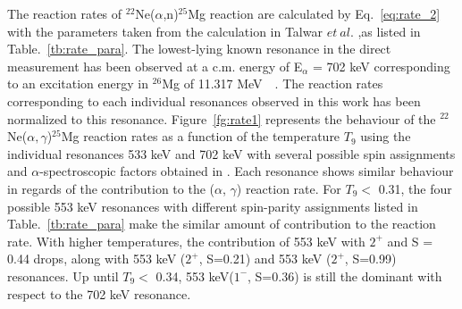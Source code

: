 The reaction rates of $^{22}$Ne($\alpha$,n)$^{25}$Mg reaction are calculated by Eq.~\ref{eq:rate_2} with the parameters taken from the calculation in Talwar $et\ al.$\citep{Rashi2016} ,as listed in Table.~\ref{tb:rate_para}. The lowest-lying known resonance in the direct measurement has been observed at a c.m. energy of E$_\alpha$ = 702 keV corresponding to an excitation energy in $^{26}$Mg of 11.317 MeV~\citep{Wolke1989}~\citep{Jaeger2001}. The reaction rates corresponding to each individual resonances observed in this work has been normalized to this resonance.   Figure~\ref{fg:rate1} represents the behaviour of the $^{22}$Ne($\alpha,\gamma$)$^{25}$Mg reaction rates as a function of the temperature $T_9$ using the individual resonances 533 keV and 702 keV with several possible spin assignments and $\alpha$-spectroscopic factors obtained in \citep{Rashi2016}. Each resonance shows  similar behaviour in regards of the contribution to the ($\alpha$, $\gamma$) reaction rate.  For $T_9 < $ 0.31, the  four possible 553 keV resonances with different spin-parity assignments listed in Table.~\ref{tb:rate_para} make the similar  amount of contribution to the reaction rate. With higher temperatures, the contribution of 553 keV with $2^+$ and S = 0.44 drops, along with  553 keV ($2^+$, S=0.21) and 553 keV ($2^+$, S=0.99) resonances. Up until   $T_9 < $ 0.34, 553 keV($1^-$, S=0.36) is still the dominant with respect to the 702 keV resonance.

